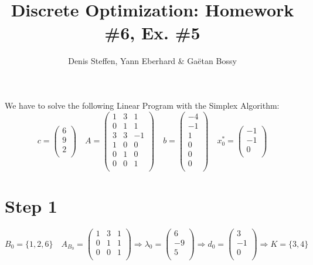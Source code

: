 \documentclass[a4paper,11pt,french]{article}
\title{Discrete Optimization: Homework \#6, Ex. \#5}
\author{Denis Steffen, Yann Eberhard \& Gaëtan Bossy}
\begin{document}
    
    \maketitle
    \noindent We have to solve the following Linear Program with the Simplex Algorithm:
    \begin{displaymath}
    c=\left(\begin{array}{c} 6\\ 9\\ 2\\ \end{array}\right)\quad A=\left(
\begin{array}{ccc}
1 & 3 & 1\\
0 & 1 & 1 \\
3 & 3 & -1\\
1 & 0 & 0\\
0 & 1 & 0\\
0 & 0 & 1\\
\end{array}
\right) \quad b=\left(\begin{array}{c}-4\\-1\\1\\0\\0\\0\\ \end{array}\right)\quad x_{0}^*=\left(\begin{array}{c}-1\\-1\\0\\\end{array}\right)
  \end{displaymath}
\section{Step 1}
  \begin{displaymath}
  B_0=\{1,2,6\}\quad A_{B_0}=\left(
\begin{array}{ccc}
1 & 3 & 1\\
0 & 1 & 1 \\
0 & 0 & 1\\
\end{array}
\right) \Rightarrow \lambda_0=\left(\begin{array}{c} 6\\ -9\\ 5\\ \end{array}\right)\Rightarrow d_0=\left(\begin{array}{c} 3\\ -1\\ 0\\ \end{array}\right)\Rightarrow K=\{3,4\}
   \end{displaymath}
\end{document}
